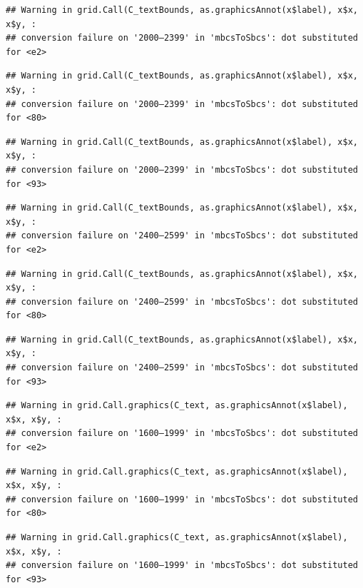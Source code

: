 \documentclass[
]{article}
\begin{document}
\begin{verbatim}
## Warning in grid.Call(C_textBounds, as.graphicsAnnot(x$label), x$x, x$y, :
## conversion failure on '2000–2399' in 'mbcsToSbcs': dot substituted for <e2>
\end{verbatim}

\begin{verbatim}
## Warning in grid.Call(C_textBounds, as.graphicsAnnot(x$label), x$x, x$y, :
## conversion failure on '2000–2399' in 'mbcsToSbcs': dot substituted for <80>
\end{verbatim}

\begin{verbatim}
## Warning in grid.Call(C_textBounds, as.graphicsAnnot(x$label), x$x, x$y, :
## conversion failure on '2000–2399' in 'mbcsToSbcs': dot substituted for <93>
\end{verbatim}

\begin{verbatim}
## Warning in grid.Call(C_textBounds, as.graphicsAnnot(x$label), x$x, x$y, :
## conversion failure on '2400–2599' in 'mbcsToSbcs': dot substituted for <e2>
\end{verbatim}

\begin{verbatim}
## Warning in grid.Call(C_textBounds, as.graphicsAnnot(x$label), x$x, x$y, :
## conversion failure on '2400–2599' in 'mbcsToSbcs': dot substituted for <80>
\end{verbatim}

\begin{verbatim}
## Warning in grid.Call(C_textBounds, as.graphicsAnnot(x$label), x$x, x$y, :
## conversion failure on '2400–2599' in 'mbcsToSbcs': dot substituted for <93>
\end{verbatim}

\begin{verbatim}
## Warning in grid.Call.graphics(C_text, as.graphicsAnnot(x$label), x$x, x$y, :
## conversion failure on '1600–1999' in 'mbcsToSbcs': dot substituted for <e2>
\end{verbatim}

\begin{verbatim}
## Warning in grid.Call.graphics(C_text, as.graphicsAnnot(x$label), x$x, x$y, :
## conversion failure on '1600–1999' in 'mbcsToSbcs': dot substituted for <80>
\end{verbatim}

\begin{verbatim}
## Warning in grid.Call.graphics(C_text, as.graphicsAnnot(x$label), x$x, x$y, :
## conversion failure on '1600–1999' in 'mbcsToSbcs': dot substituted for <93>
\end{verbatim}
\end{document}
